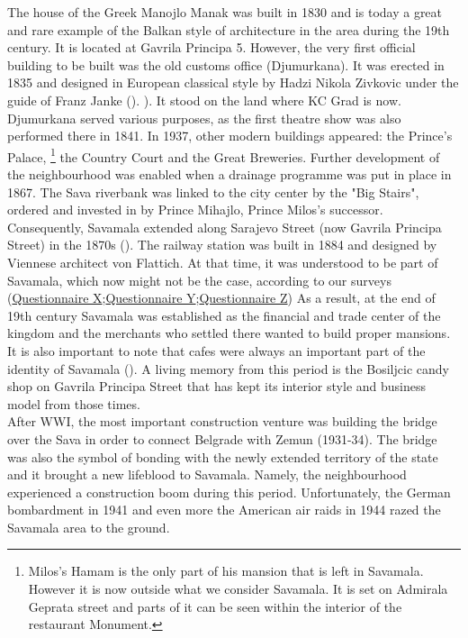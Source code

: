 \documentclass[11pt]{report}
\begin{document}
The house of the Greek Manojlo Manak was built in 1830 and is today a great and rare example of the Balkan style of architecture in the area during the 19th century. It is located at Gavrila Principa 5. However, the very first official building to be built was the old customs office (Djumurkana). It was erected in 1835 and designed in European classical style by Hadzi Nikola Zivkovic under the guide of Franz Janke (\href{Blagojevic}{\citealt{blagojevic_urban_2009}}). ). It stood on the land where KC Grad is now. Djumurkana served various purposes, as the first theatre show was also performed there in 1841. In 1937, other modern buildings appeared: the Prince's Palace,
\footnote{Milos’s Hamam is the only  part of his mansion that is left in Savamala. However it is now outside what we consider Savamala. It is set on Admirala Geprata street and parts of it can be seen within the interior
of the restaurant Monument.}
the Country Court and the Great Breweries. Further development  of  the  neighbourhood  was  enabled when a drainage programme  was  put  in place  in  1867.  The  Sava  riverbank  was  linked  to the city center by the "Big Stairs", ordered and invested in by Prince Mihajlo, Prince Milos’s successor. Consequently, Savamala  extended along Sarajevo Street (now Gavrila Principa Street) in the 1870s  (\href{Krusche}{\citealt{krusche_bureau_2015}}).
The railway station was built in 1884 and designed by Viennese architect von Flattich. At that time, it was understood to be part of Savamala, which now might not be the case, according to our surveys (\href{Questionnaire Experts Savamala}{Questionnaire X};\href{Questionnaire Experts Savamala}{Questionnaire Y};\href{Questionnaire Experts Savamala}{Questionnaire Z})
As a result, at the end of 19th century Savamala was established as the financial and trade center of the kingdom  and the merchants who settled there wanted to build proper mansions. It is also important to note that cafes were always an important part of the identity of Savamala  (\href{Nusic}{\citealt{nusic_kafane_2013}}). A living memory from this period is the Bosiljcic candy shop on Gavrila Principa Street that has kept its interior style and business model from those times.
\\
After WWI, the most important construction venture was building the bridge over the Sava in order to connect Belgrade with Zemun (1931-34). The bridge was also the symbol of bonding with the newly extended territory of the state and it brought a new lifeblood to Savamala. Namely, the neighbourhood experienced a construction boom during this period. Unfortunately, the German bombardment in 1941 and even more the American air raids in 1944 razed the Savamala area to the ground.
\end{document}
